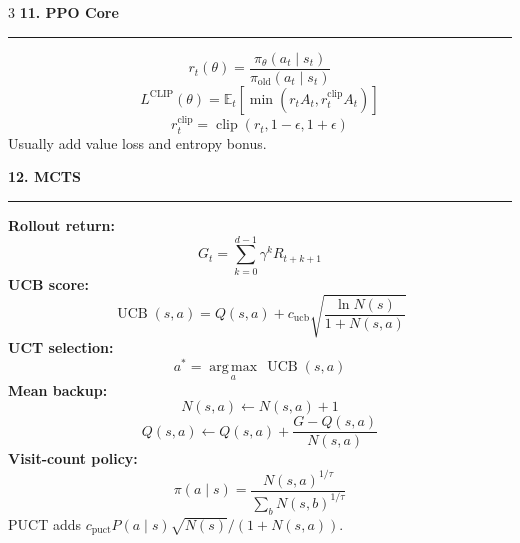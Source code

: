 \documentclass[a4paper]{article}
\newcommand{\sect}[1]{\vspace{2pt}\noindent\textbf{\large #1}\par\hrule\vspace{2pt}}
\begin{document}
\begin{multicols*}{3}
\sect{11. PPO Core}
\[
r_t(\theta)=
\frac{\pi_\theta(a_t\mid s_t)}
{\pi_{\text{old}}(a_t\mid s_t)}
\]
\[
L^{\text{CLIP}}(\theta)
=\mathbb E_t\!\left[
\min(r_tA_t,r_t^{\text{clip}}A_t)\right]
\]
\[
r_t^{\text{clip}}=\operatorname{clip}(r_t,1-\epsilon,1+\epsilon)
\]
Usually add value loss and entropy bonus.

\sect{12. MCTS}
\textbf{Rollout return:}
\[
G_t=\sum_{k=0}^{d-1}\gamma^kR_{t+k+1}
\]
\textbf{UCB score:}
\[
\operatorname{UCB}(s,a)=
Q(s,a)+c_{\text{ucb}}\sqrt{\frac{\ln N(s)}{1+N(s,a)}}
\]
\textbf{UCT selection:}
\[
a^*=\operatorname*{arg\,max}_{a}\,\operatorname{UCB}(s,a)
\]
\textbf{Mean backup:}
\[
N(s,a)\leftarrow N(s,a)+1
\]
\[
Q(s,a)\leftarrow Q(s,a)+\frac{G-Q(s,a)}{N(s,a)}
\]
\textbf{Visit-count policy:}
\[
\pi(a\mid s)=\frac{N(s,a)^{1/\tau}}{\sum_bN(s,b)^{1/\tau}}
\]
PUCT adds $c_{\text{puct}}P(a\mid s)\sqrt{N(s)}/(1+N(s,a))$.

\end{multicols*}
\end{document}
